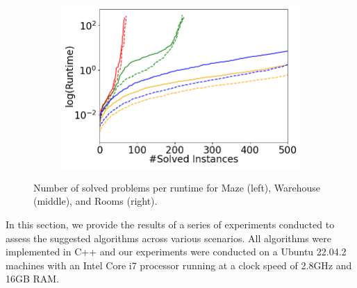 \documentclass[letterpaper]{article} %
\def\
UrlFont{\rm}  %
\theoremstyle{definition}
\begin{document}
\begin{figure}[tbhp]
\begin{subfigure}[b]{0.69\columnwidth}
    \end{subfigure}
    \begin{subfigure}[b]{0.69\columnwidth}\centering  
      \includegraphics[width=\columnwidth]{Figures/room/mixed_small_figures/cactus_with_dashed_lines.png}
    \end{subfigure}
    \caption{Number of solved problems per runtime for Maze (left), Warehouse (middle), and Rooms (right).}
    \label{fig:cactus-w-dashed-lines}
\end{figure}

In this section, we provide the results of a series of experiments conducted to assess the suggested algorithms across various scenarios. All algorithms were implemented in C++ and our experiments were conducted on a Ubuntu 22.04.2  machines with an Intel Core i7 processor running at a clock speed of 2.8GHz and 16GB RAM. 
\end{document}
